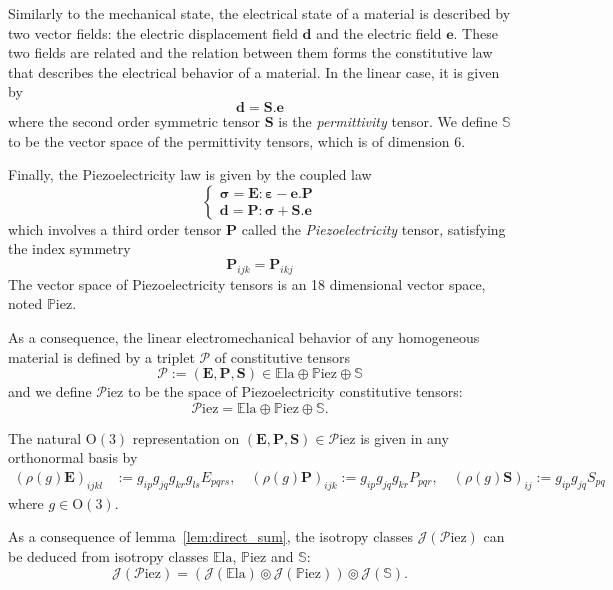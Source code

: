 \documentclass[11pt,a4paper]{amsart}
\theoremstyle{definition}
\newcommand{\Ela}{\mathbb{E}\mathrm{la}}    %
\newcommand{\Piez}{\mathbb{P}\mathrm{iez}}  %
\newcommand{\Sym}{\mathbb{S}}               %
\newcommand{\J}{\mathcal{J}}                %
\newcommand{\OO}{\mathrm{O}}                %
\newcommand{\1}{\mathds{1}}		            %
\newcommand{\bS}{\mathbf{S}}
\newcommand{\bE}{\mathbf{E}}                %
\newcommand{\bP}{\mathbf{P}}                %
\newcommand{\bsigma}{\boldsymbol{\sigma}}       %
\newcommand{\beps}{\boldsymbol{\varepsilon}}
\newcommand{\bd}{\mathbf{d}}
\newcommand{\be}{\mathbf{e}}
\begin{document}
Similarly to the mechanical state, the electrical state of a material is described by two vector fields: the electric displacement field $\bd$ and the electric field $\be$. These two fields are related and the relation between them forms the constitutive law that describes the electrical behavior of a material. In the linear case, it is given by
\begin{equation*}
  \bd=\bS.\be
\end{equation*}
where the second order symmetric tensor $\bS$ is the \emph{permittivity} tensor. We define $\Sym$ to be the vector space of the permittivity tensors, which is of dimension 6.

Finally, the Piezoelectricity law is given by the coupled law
\begin{equation*}
  \begin{cases}
    \bsigma=\bE:\beps-\be.\bP \\
    \bd=\bP:\bsigma+\bS.\be
  \end{cases}
\end{equation*}
which involves a third order tensor $\bP$ called the \emph{Piezoelectricity} tensor, satisfying the index symmetry
\begin{equation*}
  \bP_{ijk}=\bP_{ikj}
\end{equation*}
The vector space of Piezoelectricity tensors is an 18 dimensional vector space, noted $\Piez$.

As a consequence, the linear electromechanical behavior of any homogeneous material is defined by a triplet $\mathcal{P}$ of constitutive tensors
\begin{equation*}
  \mathcal{P}:=(\bE,\bP,\bS)\in \Ela \oplus \Piez \oplus \Sym
\end{equation*}
and we define $\mathcal{P}$iez to be the space of Piezoelectricity constitutive tensors:
\begin{equation*}
  \mathcal{P}\text{iez}=\Ela \oplus \Piez \oplus \Sym.
\end{equation*}

The natural $\OO(3)$ representation on $(\bE,\bP,\bS)\in \mathcal{P}\text{iez}$ is given in any orthonormal basis by
\begin{align}\label{eq:New_Tensors}
  (\rho(g)\bE)_{ijkl} & :=g_{ip}g_{jq}g_{kr}g_{ls}E_{pqrs},\quad (\rho(g)\bP)_{ijk}:=g_{ip}g_{jq}g_{kr}P_{pqr},\quad
  (\rho(g)\bS)_{ij}:=g_{ip}g_{jq}S_{pq}
\end{align}
where $g\in\OO(3)$.

As a consequence of lemma~\ref{lem:direct_sum}, the isotropy classes $\J(\mathcal{P}\text{iez})$ can be deduced from isotropy classes $\Ela$, $\Piez$ and $\Sym$:
\begin{equation*}
  \J(\mathcal{P}\text{iez})=\left(\J(\Ela)\circledcirc \J(\Piez)\right) \circledcirc \J(\Sym).
\end{equation*}
\end{document}

